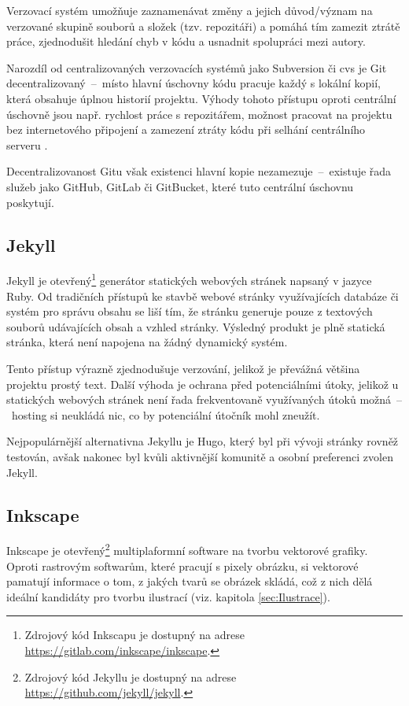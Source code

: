 \documentclass[a4paper, 12pt]{article}
\newcommand*{\fullref}[1]{\hyperref[{#1}]{\ref*{#1}}}
\begin{document}
  Verzovací systém umožňuje zaznamenávat změny a jejich důvod/význam na verzované skupině souborů a složek (tzv. repozitáři) a pomáhá tím zamezit ztrátě práce, zjednodušit hledání chyb v kódu a usnadnit spolupráci mezi autory.

  Narozdíl od centralizovaných verzovacích systémů jako Subversion či \gls{cvs} je Git decentralizovaný~--~místo hlavní úschovny kódu pracuje každý s lokální kopií, která obsahuje úplnou historií projektu. Výhody tohoto přístupu oproti centrální úschovně jsou např. rychlost práce s repozitářem, možnost pracovat na projektu bez internetového připojení a zamezení ztráty kódu při selhání centrálního serveru \cite{cvcs-vs-dvcs}.

  Decentralizovanost Gitu však existenci hlavní kopie nezamezuje~--~existuje řada služeb jako GitHub, GitLab či GitBucket, které tuto centrální úschovnu poskytují.


  \subsection{Jekyll} \label{sec:Jekyll}
  Jekyll je otevřený\footnote{Zdrojový kód Inkscapu je dostupný na adrese \url{https://gitlab.com/inkscape/inkscape}.} generátor statických webových stránek napsaný v jazyce Ruby. Od tradičních přístupů ke stavbě webové stránky využívajících databáze či systém pro správu obsahu se liší tím, že stránku generuje pouze z textových souborů udávajících obsah a vzhled stránky. Výsledný produkt je plně statická stránka, která není napojena na žádný dynamický systém.

  Tento přístup výrazně zjednodušuje verzování, jelikož je převážná většina projektu prostý text. Další výhoda je ochrana před potenciálními útoky, jelikož u statických webových stránek není řada frekventovaně využívaných útoků možná~--~hosting si neukládá nic, co by potenciální útočník mohl zneužít.

  Nejpopulárnější alternativna Jekyllu je Hugo, který byl při vývoji stránky rovněž testován, avšak nakonec byl kvůli aktivnější komunitě a osobní preferenci zvolen Jekyll.


  \subsection{Inkscape} \label{sec:Inkscape}
  Inkscape je otevřený\footnote{Zdrojový kód Jekyllu je dostupný na adrese \url{https://github.com/jekyll/jekyll}.} multiplaformní software na tvorbu vektorové grafiky. Oproti rastrovým softwarům, které pracují s  pixely obrázku, si vektorové pamatují informace o tom, z jakých tvarů se obrázek skládá, což z nich dělá ideální kandidáty pro tvorbu ilustrací (viz. kapitola \fullref{sec:Ilustrace}).
\end{document}

